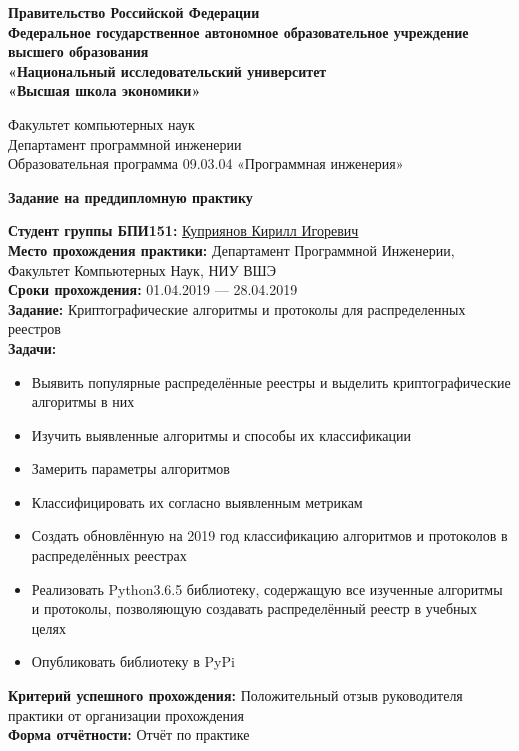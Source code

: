 \documentclass[russian, a4paper, 12pt]{article}
\begin{document}
\thispagestyle{empty}

\begin{center}
    \textbf{
        Правительство Российской Федерации\\
        Федеральное государственное автономное образовательное учреждение\\
        высшего образования\\
        «Национальный исследовательский университет\\
    «Высшая школа экономики» }

    \begin{center}  Факультет компьютерных наук\\
        Департамент  программной инженерии\\
        Образовательная программа 09.03.04 «Программная инженерия»
    \end{center}

    {\hfill \break}

    {\Large\bfseries Задание на преддипломную практику}\\
\end{center}
\begin{flushleft}
    {\bfseries Студент группы БПИ151: } \underline{Куприянов Кирилл Игоревич}\\
    {\hfill \break}
    {\bfseries Место прохождения практики: } Департамент Программной Инженерии, Факультет Компьютерных Наук, НИУ ВШЭ\\
    {\bfseries Сроки прохождения: } 01.04.2019 --- 28.04.2019\\
    {\bfseries Задание: } Криптографические алгоритмы и протоколы для распределенных реестров\\
    {\bfseries Задачи:}
    \begin{itemize}
        \item Выявить популярные распределённые реестры и выделить криптографические алгоритмы в них
        \item Изучить выявленные алгоритмы и способы их классификации
        \item Замерить параметры алгоритмов
        \item Классифицировать их согласно выявленным метрикам
        \item Создать обновлённую на 2019 год классификацию алгоритмов и
              протоколов в распределённых реестрах
        \item Реализовать Python3.6.5 библиотеку, содержащую все изученные
              алгоритмы и протоколы, позволяющую создавать распределённый реестр
              в учебных целях
        \item Опубликовать библиотеку в PyPi
    \end{itemize}
\end{flushleft}
{\bfseries Критерий успешного прохождения: } Положительный отзыв руководителя практики от организации прохождения\\
{\bfseries Форма отчётности: } Отчёт по практике\\
\end{document}
